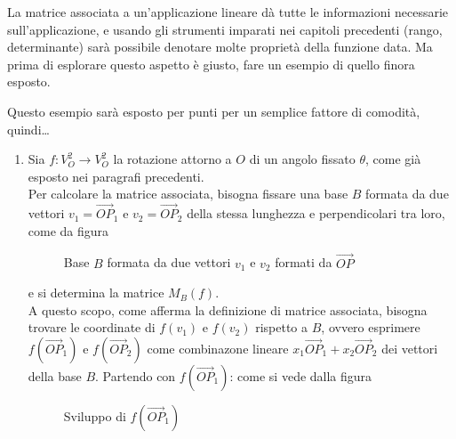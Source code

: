 La matrice associata a un'applicazione lineare dà tutte le informazioni
necessarie sull'applicazione, e usando gli strumenti imparati nei capitoli
precedenti (rango, determinante) sarà possibile denotare molte proprietà
della funzione data. Ma prima di esplorare questo aspetto è giusto, fare un
esempio di quello finora esposto.
\clearpage
\begin{es}
  \label{es:mtxAsaplin1}
  Questo esempio sarà esposto per punti per un semplice fattore di
  comodità, quindi\dots
  \begin{enumerate}
  \item Sia $f:V_O^2\to V_O^2$ la rotazione attorno a $O$ di un angolo
    fissato $\theta$, come già esposto nei paragrafi precedenti.\\
    Per calcolare la matrice associata, bisogna fissare una base $B$
    formata da due vettori $v_1=\vec{OP}_1$ e $v_2=\vec{OP}_2$ della
    stessa lunghezza e perpendicolari tra loro, come da figura
    \begin{figure}[ht!]
      \centering
      \resizebox{8cm}{!}{}
      \caption{Base $B$ formata da due vettori $v_1$ e $v_2$ formati da $\vec{OP}$}
      \label{fig:mtxAsaplin1}
    \end{figure}
    e si determina la matrice $M_B(f)$.\\
    A questo scopo, come afferma la definizione di matrice associata, bisogna
    trovare le coordinate di $f(v_1)$ e $f(v_2)$ rispetto a $B$, ovvero esprimere
    $f(\vec{OP}_1)$ e $f(\vec{OP}_2)$ come combinazone lineare $x_1\vec{OP}_1+
    x_2\vec{OP}_2$ dei vettori della base $B$. Partendo con $f(\vec{OP}_1)$: come
    si vede dalla figura
    \begin{figure}[ht!]
      \centering
      \resizebox{8cm}{!}{}
      \caption{Sviluppo di $f(\vec{OP}_1)$}
      \label{fig:mtxAsaplin2}
    \end{figure}


\end{enumerate}
\end{es}

